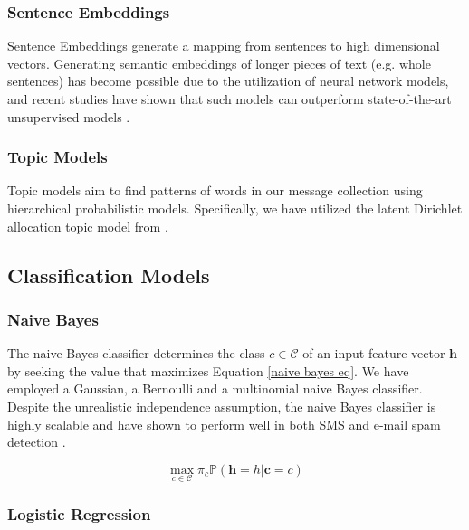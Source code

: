 \documentclass[letterpaper]{article}
\begin{document}
\subsubsection{Sentence Embeddings}  \label{Sentence Embeddings}

Sentence Embeddings generate a mapping from sentences to high dimensional vectors. Generating semantic embeddings of longer pieces of text (e.g. whole sentences) has become possible due to the utilization of neural network models, and recent studies have shown that such models can outperform state-of-the-art unsupervised models \cite{pagliardini2017unsupervised}.

\subsubsection{Topic Models}  \label{Topics}

Topic models aim to find patterns of words in our message collection using hierarchical probabilistic models. Specifically, we have utilized the latent Dirichlet allocation topic model from \cite{blei2006dynamic}.

\subsection{Classification Models}  \label{Classification}

\subsubsection{Naive Bayes}  \label{Naive Bayes}

The naive Bayes classifier determines the class $c \in \mathcal{C}$ of an input feature vector $\mathbf{h}$ by seeking the value that maximizes Equation \ref{naive bayes eq}. We have employed a Gaussian, a Bernoulli and a multinomial naive Bayes classifier. Despite the unrealistic independence assumption, the naive Bayes classifier is highly scalable and have shown to perform well in both SMS and e-mail spam detection \cite{gomez2006content} \cite{androutsopoulos2000evaluation}.

\begin{equation} \label{naive bayes eq}
	\underset{c \in \mathcal{C}}{\max} \pi_c \mathds{P} (\mathbf{h} = h | \mathbf{c} = c)
\end{equation}

\subsubsection{Logistic Regression}  \label{Logistic Regression}
\end{document}
